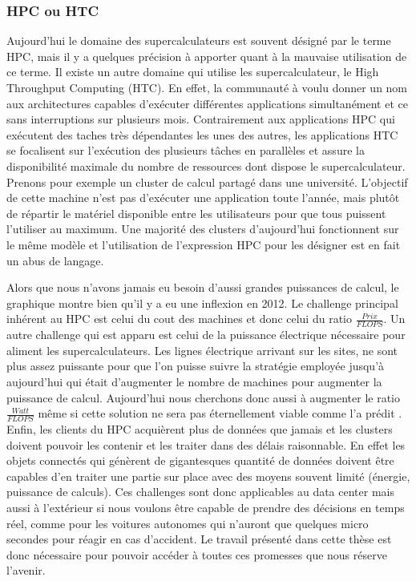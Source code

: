 \subsubsection{HPC ou HTC}
Aujourd'hui le domaine des supercalculateurs est souvent désigné par le terme HPC, mais il y a quelques précision à apporter quant à la mauvaise utilisation de ce terme. Il existe un autre domaine qui utilise les supercalculateur, le High Throughput Computing (HTC). En effet, la communauté à voulu donner un nom aux architectures capables d'exécuter différentes applications simultanément et ce sans interruptions sur plusieurs mois. Contrairement aux applications HPC qui exécutent des taches très dépendantes les unes des autres, les applications HTC se focalisent sur l'exécution des plusieurs tâches en parallèles et assure la disponibilité maximale du nombre de ressources dont dispose le supercalculateur. Prenons pour exemple un cluster de calcul partagé dans une université. L'objectif de cette machine n'est pas d'exécuter une application toute l'année, mais plutôt de répartir le matériel disponible entre les utilisateurs pour que tous puissent l'utiliser au maximum. Une majorité des clusters d'aujourd'hui fonctionnent sur le même modèle et l'utilisation de l'expression HPC pour les désigner est en fait un abus de langage.




Alors que nous n'avons jamais eu besoin d'aussi grandes puissances de calcul, le graphique montre bien qu'il y a eu une inflexion en 2012. Le challenge principal inhérent au HPC est celui du cout des machines et donc celui du ratio $\frac{Prix}{FLOPS}$. Un autre challenge qui est apparu est celui de la puissance électrique nécessaire pour aliment les supercalculateurs. Les lignes électrique arrivant sur les sites, ne sont plus assez puissante pour que l'on puisse suivre la stratégie employée jusqu'à aujourd'hui qui était d'augmenter le nombre de machines pour augmenter la puissance de calcul. Aujourd'hui nous cherchons donc aussi à augmenter le ratio $\frac{Watt}{FLOPS}$ même si cette solution ne sera pas éternellement viable comme l'a prédit \cite{5392446}.
Enfin, les clients du HPC acquièrent plus de données que jamais et les clusters doivent pouvoir les contenir et les traiter dans des délais raisonnable. En effet les objets connectés qui génèrent de gigantesques quantité de données doivent être capables d'en traiter une partie sur place avec des moyens souvent limité (énergie, puissance de calculs). Ces challenges sont donc applicables au data center mais aussi à l'extérieur si nous voulons être capable de prendre des décisions en temps réel, comme pour les voitures autonomes qui n'auront que quelques micro secondes pour réagir en cas d'accident. Le travail présenté dans cette thèse est donc nécessaire pour pouvoir accéder à toutes ces promesses que nous réserve l'avenir.


